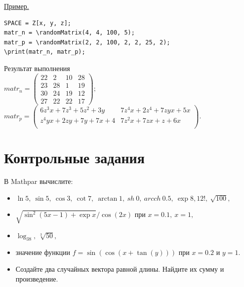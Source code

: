 \smallskip

\underline{Пример. }

\vspace*{-3mm}
\begin{verbatim}
SPACE = Z[x, y, z];
matr_n = \randomMatrix(4, 4, 100, 5);
matr_p = \randomMatrix(2, 2, 100, 2, 2, 25, 2);
\print(matr_n, matr_p);
\end{verbatim}

Результат выполнения\\
$matr_n =\left(\begin{array}{cccc}22 &2 & 10 &28 \\ 23 &28 &1 & 19 \\ 30 &24 &19 &12 \\ 27 &22 &22 &17 \end{array}\right) ; $ \\
$matr_p =\left(\begin{array}{cc}
6z^3x+7z^3+5z^2+3y & 7z^4x+2z^4+7zyx+5x\\
 z^4yx+2zy+7y+7x+4&  7z^2x+7zx+z+6x \\
\end{array}\right). $

\section{Контрольные задания}
В Mathpar вычислите:
\begin{itemize}
  \item $\ln 5, \ \sin 5, \ \cos 3, \ \cot  7, \ \arctan  1, \ sh\  0, \ arcch\  0. 5, \ \exp 8, 12!, \ \sqrt{100}, $
  \item $\sqrt{\sin ^2(5x-1)+\exp x}/ \cos(2x)$ при $x=0. 1, \ x=1, $
  \item $\log_38, \ \sqrt[3]{50}, $ 
  \item значение функции $f = \sin(\cos(x+\tan(y)))$ при $x=0. 2$ и $y=1$. 
  \item Создайте два случайных вектора равной длины.  Найдите их сумму и произведение. 
\end{itemize}
